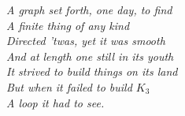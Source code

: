 \begin{frame}
\begin{center}
\textit{A graph set forth, one day, to find\\
A finite thing of any kind\\
Directed ’twas, yet it was smooth\\
And at length one still in its youth\\
It strived to build things on its land\\
But when it failed to build \(K_3\)\\
A loop it had to see.\\} 
\end{center}
\end{frame}